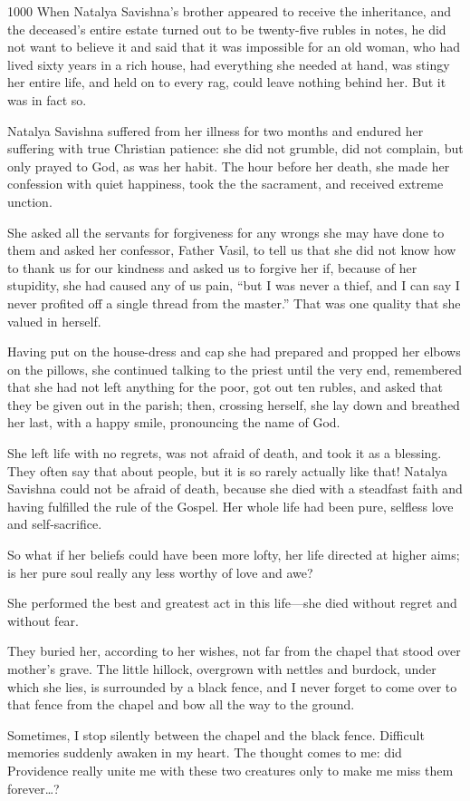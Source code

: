 \begin{tolerant}{1000}
When Natalya Savishna's brother appeared to receive the inheritance, and the deceased's entire estate turned out to be twenty-five rubles in notes, he did not want to believe it and said that it was impossible for an old woman, who had lived sixty years in a rich house, had everything she needed at hand, was stingy her entire life, and held on to every rag, could leave nothing behind her. But it was in fact so.
\end{tolerant}

Natalya Savishna suffered from her illness for two months and endured her suffering with true Christian patience: she did not grumble, did not complain, but only prayed to God, as was her habit. The hour before her death, she made her confession with quiet happiness, took the the sacrament, and received extreme unction.

She asked all the servants for forgiveness for any wrongs she may have done to them and asked her confessor, Father Vasil, to tell us that she did not know how to thank us for our kindness and asked us to forgive her if, because of her stupidity, she had caused any of us pain, ``but I was never a thief, and I can say I never profited off a single thread from the master.'' That was one quality that she valued in herself.

Having put on the house-dress and cap she had prepared and propped her elbows on the pillows, she continued talking to the priest until the very end, remembered that she had not left anything for the poor, got out ten rubles, and asked that they be given out in the parish; then, crossing herself, she lay down and breathed her last, with a happy smile, pronouncing the name of God.

She left life with no regrets, was not afraid of death, and took it as a blessing. They often say that about people, but it is so rarely actually like that! Natalya Savishna could not be afraid of death, because she died with a steadfast faith and having fulfilled the rule of the Gospel. Her whole life had been pure, selfless love and self-sacrifice.

So what if her beliefs could have been more lofty, her life directed at higher aims; is her pure soul really any less worthy of love and awe?

She performed the best and greatest act in this life---she died without regret and without fear.

They buried her, according to her wishes, not far from the chapel that stood over mother's grave. The little hillock, overgrown with nettles and burdock, under which she lies, is surrounded by a black fence, and I never forget to come over to that fence from the chapel and bow all the way to the ground.

Sometimes, I stop silently between the chapel and the black fence. Difficult memories suddenly awaken in my heart. The thought comes to me: did Providence really unite me with these two creatures only to make me miss them forever\ldots{}?
